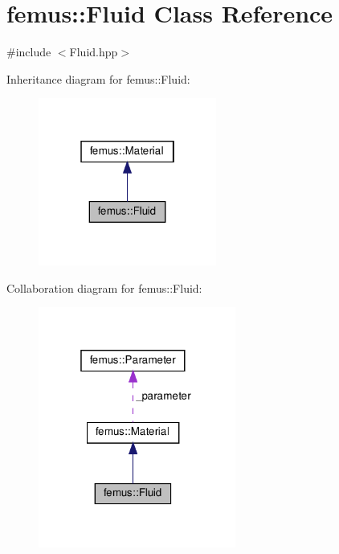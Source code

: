 \hypertarget{classfemus_1_1_fluid}{}\section{femus\+:\+:Fluid Class Reference}
\label{classfemus_1_1_fluid}


{\ttfamily \#include $<$Fluid.\+hpp$>$}



Inheritance diagram for femus\+:\+:Fluid\+:
\nopagebreak
\begin{figure}[H]
\begin{center}
\leavevmode
\includegraphics[width=166pt]{classfemus_1_1_fluid__inherit__graph}
\end{center}
\end{figure}


Collaboration diagram for femus\+:\+:Fluid\+:
\nopagebreak
\begin{figure}[H]
\begin{center}
\leavevmode
\includegraphics[width=184pt]{classfemus_1_1_fluid__coll__graph}
\end{center}
\end{figure}

